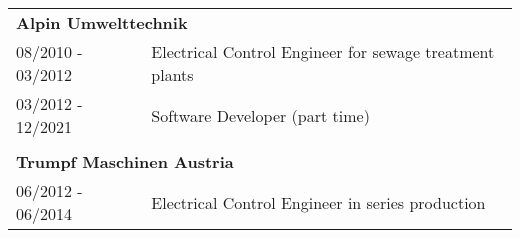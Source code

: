 
\\\\
\begin{tabular} { l p{3.9cm} }

  \multicolumn{2}{l}{\textbf{Alpin Umwelttechnik}}\\
  \small{08/2010 - 03/2012} & Electrical Control Engineer for sewage treatment plants \\
  \small{03/2012 - 12/2021} & Software Developer (part time)\\\\

  \multicolumn{2}{l}{\textbf{Trumpf Maschinen Austria}}\\
  \small{06/2012 - 06/2014} & Electrical Control Engineer in series production
\end{tabular}
